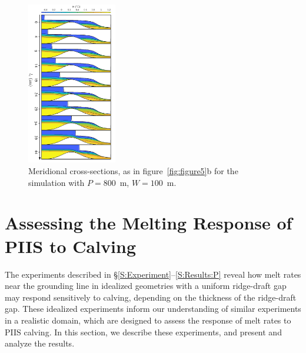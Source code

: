 \documentclass[draft]{agujournal2019}
\begin{document}
\begin{figure}
    \centering
    \includegraphics[width = 0.35\textwidth]{../make_figures/plots/figure9.pdf}
    \caption{Meridional cross-sections, as in figure~\ref{fig:figure5}b for the simulation with $P=800$~m, $W=100$~m. }
    \label{fig:figure9}
\end{figure}

\section{Assessing the Melting Response of PIIS to Calving}\label{S:Realistic}
The experiments described in \S\ref{S:Experiment}--\ref{S:Results:P} reveal how melt rates near the grounding line in idealized geometries with a uniform ridge-draft gap may respond sensitively to calving, depending on the thickness of the ridge-draft gap. These idealized experiments inform our understanding of similar experiments in a realistic domain, which are designed to assess the response of melt rates to PIIS calving. In this section, we describe these experiments, and present and analyze the results.
\end{document}
